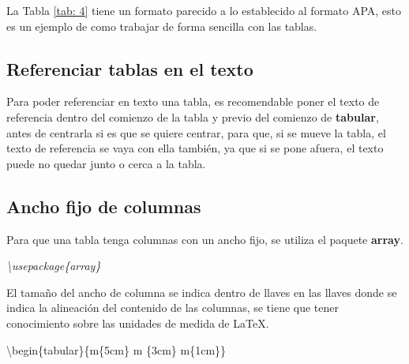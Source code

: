 La Tabla \ref{tab: 4} tiene un formato parecido a lo establecido al formato APA, esto es un ejemplo de como trabajar de forma sencilla con las tablas.


\subsection{Referenciar tablas en el texto}

Para poder referenciar en texto una tabla, es recomendable poner el texto de referencia dentro del comienzo de la tabla y previo del comienzo de \textbf{tabular}, antes de centrarla si es que se quiere centrar, para que, si se mueve la tabla, el texto de referencia se vaya con ella también, ya que si se pone afuera, el texto puede no quedar junto o cerca a la tabla.


\subsection{Ancho fijo de columnas}

Para que una tabla tenga columnas con un ancho fijo, se utiliza el paquete \textbf{array}.
\begin{center}
    \textit{\textbackslash{usepackage\{array\}}}
\end{center}

El tamaño del ancho de columna se indica dentro de llaves en las llaves donde se indica la alineación del contenido de las columnas, se tiene que tener conocimiento sobre las unidades de medida de \LaTeX.
\begin{center}
    \textbackslash{begin\{tabular\}\{m\{5cm\} m \{3cm\} m\{1cm\}\}}
\end{center}

